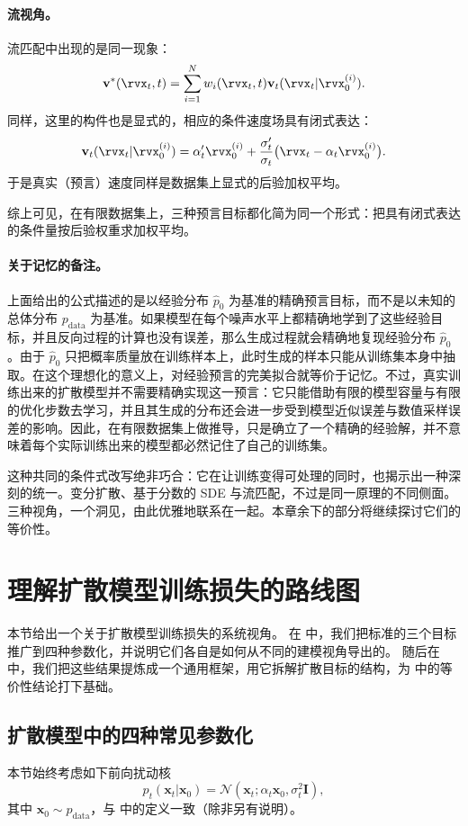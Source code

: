 {\paragraph{流视角。}
流匹配中出现的是同一现象：
\[
\mathbf{v}^*(\rvx_t,t)
=
\sum_{i=1}^N
w_i(\rvx_t,t)
\mathbf{v}_t(\rvx_t|\rvx_0^{(i)}).
\]
同样，这里的构件也是显式的，相应的条件速度场具有闭式表达：
\[
\mathbf{v}_t(\rvx_t|\rvx_0^{(i)})
=
{\alpha}'_t \rvx_0^{(i)}
+
\frac{{\sigma}'_t}{\sigma_t}\bigl(\rvx_t-\alpha_t\rvx_0^{(i)}\bigr).
\]
于是真实（预言）速度同样是数据集上显式的后验加权平均。

综上可见，在有限数据集上，三种预言目标都化简为同一个形式：把具有闭式表达的条件量按后验权重求加权平均。

\paragraph{关于记忆的备注。} 上面给出的公式描述的是以经验分布 $\hat p_0$ 为基准的精确预言目标，而不是以未知的总体分布 $p_{\mathrm{data}}$ 为基准。如果模型在每个噪声水平上都精确地学到了这些经验目标，并且反向过程的计算也没有误差，那么生成过程就会精确地复现经验分布 $\hat p_0$。由于 $\hat p_0$ 只把概率质量放在训练样本上，此时生成的样本只能从训练集本身中抽取。在这个理想化的意义上，对经验预言的完美拟合就等价于记忆。不过，真实训练出来的扩散模型并不需要精确实现这一预言：它只能借助有限的模型容量与有限的优化步数去学习，并且其生成的分布还会进一步受到模型近似误差与数值采样误差的影响。因此，在有限数据集上做推导，只是确立了一个精确的经验解，并不意味着每个实际训练出来的模型都必然记住了自己的训练集。

}

这种共同的条件式改写绝非巧合：它在让训练变得可处理的同时，也揭示出一种深刻的统一。变分扩散、基于分数的 SDE 与流匹配，不过是同一原理的不同侧面。三种视角，一个洞见，由此优雅地联系在一起。本章余下的部分将继续探讨它们的等价性。


\section{理解扩散模型训练损失的路线图}\label{sec:elucidating}

本节给出一个关于扩散模型训练损失的系统视角。
在  中，我们把标准的三个目标推广到四种参数化，并说明它们各自是如何从不同的建模视角导出的。
随后在  中，我们把这些结果提炼成一个通用框架，用它拆解扩散目标的结构，为  中的等价性结论打下基础。


\subsection{扩散模型中的四种常见参数化}\label{subsec:four-predictions}
本节始终考虑如下前向扰动核
\[
p_t(\mathbf{x}_t|\mathbf{x}_0) = \mathcal{N}\left(\mathbf{x}_t; \alpha_t \mathbf{x}_0, \sigma_t^2 \mathbf{I} \right),
\]
其中 $\mathbf{x}_0 \sim p_{\mathrm{data}}$，与  中的定义一致（除非另有说明）。


